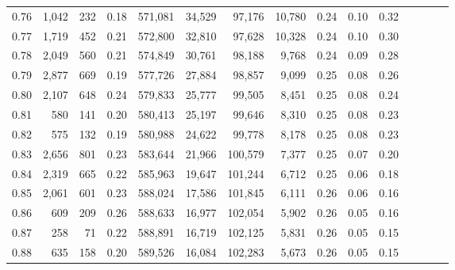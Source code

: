 \begin{tabular}{rrrcrrrrrrrrrrr}
0.76 &   1,042 &    232 &                                       0.18 &  571,081 &   34,529 &   97,176 &   10,780 &  0.24 &  0.10 &                         0.32 \\
0.77 &   1,719 &    452 &                                       0.21 &  572,800 &   32,810 &   97,628 &   10,328 &  0.24 &  0.10 &                         0.30 \\
0.78 &   2,049 &    560 &                                       0.21 &  574,849 &   30,761 &   98,188 &    9,768 &  0.24 &  0.09 &                         0.28 \\
0.79 &   2,877 &    669 &                                       0.19 &  577,726 &   27,884 &   98,857 &    9,099 &  0.25 &  0.08 &                         0.26 \\
0.80 &   2,107 &    648 &                                       0.24 &  579,833 &   25,777 &   99,505 &    8,451 &  0.25 &  0.08 &                         0.24 \\
0.81 &     580 &    141 &                                       0.20 &  580,413 &   25,197 &   99,646 &    8,310 &  0.25 &  0.08 &                         0.23 \\
0.82 &     575 &    132 &                                       0.19 &  580,988 &   24,622 &   99,778 &    8,178 &  0.25 &  0.08 &                         0.23 \\
0.83 &   2,656 &    801 &                                       0.23 &  583,644 &   21,966 &  100,579 &    7,377 &  0.25 &  0.07 &                         0.20 \\
0.84 &   2,319 &    665 &                                       0.22 &  585,963 &   19,647 &  101,244 &    6,712 &  0.25 &  0.06 &                         0.18 \\
0.85 &   2,061 &    601 &                                       0.23 &  588,024 &   17,586 &  101,845 &    6,111 &  0.26 &  0.06 &                         0.16 \\
0.86 &     609 &    209 &                                       0.26 &  588,633 &   16,977 &  102,054 &    5,902 &  0.26 &  0.05 &                         0.16 \\
0.87 &     258 &     71 &                                       0.22 &  588,891 &   16,719 &  102,125 &    5,831 &  0.26 &  0.05 &                         0.15 \\
0.88 &     635 &    158 &                                       0.20 &  589,526 &   16,084 &  102,283 &    5,673 &  0.26 &  0.05 &                         0.15 \\

\end{tabular}
